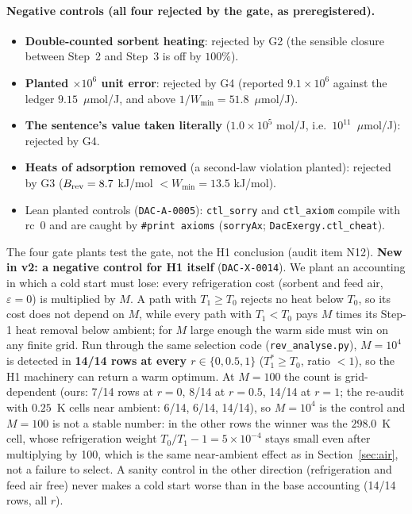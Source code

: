 \documentclass[10pt]{article}
\newcommand{\lean}[1]{\texttt{#1}}
\newcommand{\id}[1]{\texttt{DAC-#1}}
\newcommand{\umolJ}{\ensuremath{\mu}mol/J}
\begin{document}
\paragraph{Negative controls (all four rejected by the gate, as preregistered).}
\begin{itemize}\itemsep=0pt
\item \textbf{Double-counted sorbent heating}: rejected by G2 (the sensible closure between Step~2 and Step~3 is off by $100\%$).
\item \textbf{Planted $\times10^{6}$ unit error}: rejected by G4 (reported $9.1\times10^{6}$ against the ledger $9.15$~\umolJ{}, and above $1/W_{\min}=51.8$~\umolJ{}).
\item \textbf{The sentence's value taken literally} ($1.0\times10^5$ mol/J, i.e.\ $10^{11}$~\umolJ{}): rejected by G4.
\item \textbf{Heats of adsorption removed} (a second-law violation planted): rejected by G3 ($B_{\rm rev}=8.7$ kJ/mol $<W_{\min}=13.5$ kJ/mol).
\item Lean planted controls (\id{A-0005}): \lean{ctl\_sorry} and \lean{ctl\_axiom} compile with rc~0 and are caught by \lean{\#print axioms} (\lean{sorryAx}; \lean{DacExergy.ctl\_cheat}).
\end{itemize}
The four gate plants test the gate, not the H1 conclusion (audit item N12). \textbf{New in v2: a negative control for H1 itself} (\id{X-0014}). We plant an accounting in which a cold start must lose: every refrigeration cost (sorbent and feed air, $\varepsilon=0$) is multiplied by $M$. A path with $T_1\ge T_0$ rejects no heat below $T_0$, so its cost does not depend on $M$, while every path with $T_1<T_0$ pays $M$ times its Step-1 heat removal below ambient; for $M$ large enough the warm side must win on any finite grid. Run through the same selection code (\texttt{rev\_analyse.py}), $M=10^4$ is detected in \textbf{14/14 rows at every $r\in\{0,0.5,1\}$} ($T_1^\ast\ge T_0$, ratio $<1$), so the H1 machinery can return a warm optimum. At $M=100$ the count is grid-dependent (ours: 7/14 rows at $r=0$, 8/14 at $r=0.5$, 14/14 at $r=1$; the re-audit with $0.25$~K cells near ambient: 6/14, 6/14, 14/14), so $M=10^4$ is the control and $M=100$ is not a stable number: in the other rows the winner was the $298.0$~K cell, whose refrigeration weight $T_0/T_1-1=5\times10^{-4}$ stays small even after multiplying by 100, which is the same near-ambient effect as in Section~\ref{sec:air}, not a failure to select. A sanity control in the other direction (refrigeration and feed air free) never makes a cold start worse than in the base accounting (14/14 rows, all $r$).
\end{document}
